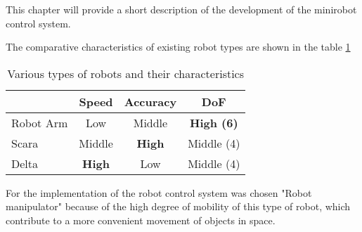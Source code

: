 
This chapter will provide a short description of the development of the minirobot control system.

The comparative characteristics of existing robot types are shown in the table \ref*{tab:robot_crt}

\begin{table}[H]
    \caption{Various types of robots and their characteristics}\label{tab:robot_crt}
    \centering
    \begin{tabular}{|l|c|c|c|}
    \hline
    \multicolumn{1}{|c|}{} & Speed                                & Accuracy                             & DoF                                      \\ \hline
    Robot Arm              & Low                                  & Middle                               & {\color[HTML]{FE0000} \textbf{High (6)}} \\ \hline
    Scara                  & Middle                               & {\color[HTML]{FE0000} \textbf{High}} & Middle (4)                               \\ \hline
    Delta                  & {\color[HTML]{FE0000} \textbf{High}} & Low                                  & Middle (4)                               \\ \hline
    \end{tabular}
 \end{table}


 For the implementation of the robot control system was chosen "Robot manipulator" because of the high degree of mobility of this type of robot, which contribute to a more convenient movement of objects in space.